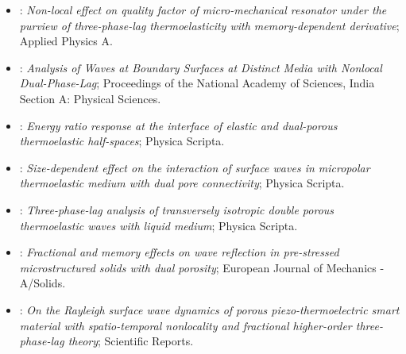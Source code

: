 \begin{itemize}
\item \citet{Tiwari2022}: \emph{Non-local effect on quality factor of micro-mechanical resonator under the purview of three-phase-lag thermoelasticity with memory-dependent derivative}; Applied Physics A.
\item \citet{Kumar2023}: \emph{Analysis of Waves at Boundary Surfaces at Distinct Media with Nonlocal Dual-Phase-Lag}; Proceedings of the National Academy of Sciences, India Section A: Physical Sciences.
\item \citet{Kumar2023PhysScr}: \emph{Energy ratio response at the interface of elastic and dual-porous thermoelastic half-spaces}; Physica Scripta.
\item \citet{Das2024}: \emph{Size-dependent effect on the interaction of surface waves in micropolar thermoelastic medium with dual pore connectivity}; Physica Scripta.
\item \citet{Pathania2024}: \emph{Three-phase-lag analysis of transversely isotropic double porous thermoelastic waves with liquid medium}; Physica Scripta.
\item \citet{Das2025}: \emph{Fractional and memory effects on wave reflection in pre-stressed microstructured solids with dual porosity}; European Journal of Mechanics - A/Solids.
\item \citet{Aldandani2026a}: \emph{On the Rayleigh surface wave dynamics of porous piezo-thermoelectric smart material with spatio-temporal nonlocality and fractional higher-order three-phase-lag theory}; Scientific Reports.
\end{itemize}
